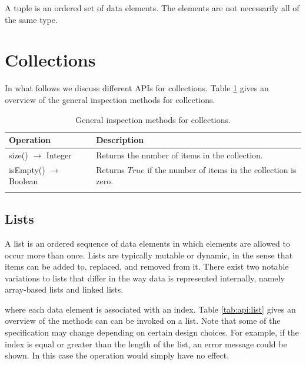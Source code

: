 A tuple is an ordered set of data elements. The elements are not necessarily all of the same type.



\section{Collections}

In what follows we discuss different APIs for collections. Table \ref{tab:api:collections} gives an overview of the general inspection methods for collections.

\begin{table}[H]
	\caption{General inspection methods for collections.}
	\label{tab:api:collections}
	\begin{tabular}{p{150px} | p{250px}}
		\textbf{Operation} & \textbf{Description} \\
		\hline
		size() $\rightarrow$ Integer & Returns the number of items in the collection. \\
		isEmpty() $\rightarrow$ Boolean & Returns $True$ if the number of items in the collection is zero. \\
		& \\
		\hline
	\end{tabular}
\end{table}



\subsection{Lists}

A list is an ordered sequence of data elements in which elements are allowed to occur more than once. Lists are typically mutable or dynamic, in the sense that items can be added to, replaced, and removed from it. There exist two notable variations to lists that differ in the way data is represented internally, namely array-based lists and linked lists.

where each data element is associated with an index. Table \ref{tab:api:list} gives an overview of the methods can can be invoked on a list. Note that some of the specification may change depending on certain design choices. For example, if the index is equal or greater than the length of the list, an error message could be shown. In this case the operation would simply have no effect.

